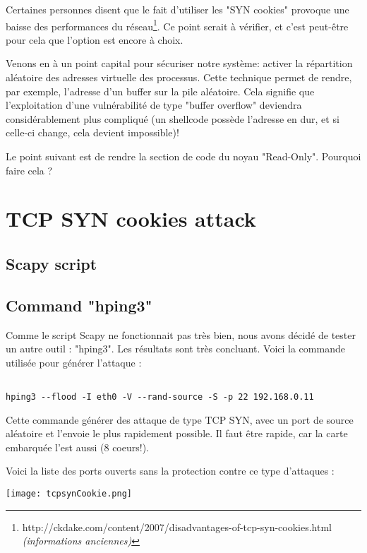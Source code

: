 Certaines personnes disent que le fait d'utiliser les "SYN cookies" provoque une baisse des performances du réseau\footnote{http://ckdake.com/content/2007/disadvantages-of-tcp-syn-cookies.html \textit{(informations anciennes)}}. Ce point serait à vérifier, et c'est peut-être pour cela que l'option est encore à choix.

Venons en à un point capital pour sécuriser notre système: activer la répartition aléatoire des adresses virtuelle des processus. 
Cette technique permet de rendre, par exemple, l'adresse d'un buffer sur la pile aléatoire. Cela signifie que l'exploitation d'une vulnérabilité de type "buffer overflow" deviendra considérablement plus compliqué (un shellcode possède l'adresse en dur, et si celle-ci change, cela devient impossible)! 

Le point suivant est de rendre la section de code du noyau "Read-Only". Pourquoi faire cela ? 


\section{TCP SYN cookies attack}
\subsection{Scapy script}




\subsection{Command "hping3"}
Comme le script Scapy ne fonctionnait pas très bien, nous avons décidé de tester un autre outil : "hping3". Les résultats sont très concluant. Voici la commande utilisée pour générer l'attaque :
\begin{lstlisting}[frame=single,style=Console]  % Start your code-block

hping3 --flood -I eth0 -V --rand-source -S -p 22 192.168.0.11
\end{lstlisting}

Cette commande générer des attaque de type TCP SYN, avec un port de source aléatoire et l'envoie le plus rapidement possible. Il faut être rapide, car la carte embarquée l'est aussi (8 coeurs!).

Voici la liste des ports ouverts sans la protection contre ce type d'attaques :
\begin{center} 
\hspace{15cm}
\texttt{[image: tcpsynCookie.png]}
\end{center}
\vspace{0.5cm}

